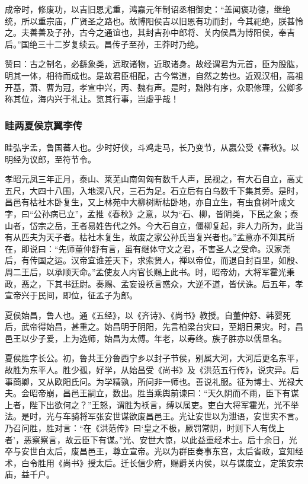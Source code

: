 \documentclass[]{article}
\begin{document}
成帝时，修废功，以吉旧恩尤重，鸿嘉元年制诏丞相御史：``盖闻褒功德，继绝统，所以重宗庙，广贤圣之路也。故博阳侯吉以旧恩有功而封，今其祀绝，朕甚怜之。夫善善及子孙，古今之通谊也，其封吉孙中郎将、关内侯昌为博阳侯，奉吉后。''国绝三十二岁复续云。昌传子至孙，王莽时乃绝。

赞曰：古之制名，必繇象类，远取诸物，近取诸身。故经谓君为元首，臣为股肱，明其一体，相待而成也。是故君臣相配，古今常道，自然之势也。近观汉相，高祖开基，萧、曹为冠，孝宣中兴，丙、魏有声。是时，黜陟有序，众职修理，公卿多称其位，海内兴于礼让。览其行事，岂虚乎哉！

\hypertarget{header-n5357}{%
\subsubsection{眭两夏侯京翼李传}\label{header-n5357}}

眭弘字孟，鲁国蕃人也。少时好侠，斗鸡走马，长乃变节，从嬴公受《春秋》。以明经为议郎，至符节令。

孝昭元凤三年正月，泰山、莱芜山南匈匈有数千人声，民视之，有大石自立，高丈五尺，大四十八围，入地深八尺，三石为足。石立后有白乌数千下集其旁。是时，昌邑有枯社木卧复生，又上林苑中大柳树断枯卧地，亦自立生，有虫食树叶成文字，曰``公孙病已立''，孟推《春秋》之意，以为``石、柳，皆阴类，下民之象；泰山者，岱宗之岳，王者易姓告代之外。今大石自立，僵柳复起，非人力所为，此当有从匹夫为天子者。枯社木复生，故废之家公孙氏当复兴者也。''孟意亦不知其所在，即说曰：``先师董仲舒有言，虽有继体守文之君，不害圣人之受命。汉家尧后，有传国之运。汉帝宜谁差天下，求索贤人，禅以帝位，而退自封百里，如殷、周二王后，以承顺天命。''孟使友人内官长赐上此书。时，昭帝幼，大将军霍光秉政，恶之，下其书廷尉。奏赐、孟妄设袄言惑众，大逆不道，皆伏诛。后五年，孝宣帝兴于民间，即位，征孟子为郎。

夏侯始昌，鲁人也。通《五经》，以《齐诗》、《尚书》教授。自董仲舒、韩婴死后，武帝得始昌，甚重之。始昌明于阴阳，先言柏梁台灾曰，至期日果灾。时，昌邑王以少子爱，上为选师，始昌为太傅。年老，以寿终。族子胜亦以儒显名。

夏侯胜字长公。初，鲁共王分鲁西宁乡以封子节侯，别属大河，大河后更名东平，故胜为东平人。胜少孤，好学，从始昌受《尚书》及《洪范五行传》，说灾异。后事蕳卿，又从欧阳氏问。为学精孰，所问非一师也。善说礼服。征为博士、光禄大夫。会昭帝崩，昌邑王嗣立，数出。胜当乘舆前谏曰：``天久阴而不雨，臣下有谋上者，陛下出欲何之？''王怒，谓胜为袄言，缚以属吏。吏白大将军霍光，光不举法。是时，光与车骑将军张安世谋欲废昌邑王。光让安世以为泄语，安世实不言。乃召问胜，胜对言：``在《洪范传》曰`皇之不极，厥罚常阴，时则下人有伐上者'，恶察察言，故云臣下有谋。''光、安世大惊，以此益重经术士。后十余日，光卒与安世白太后，废昌邑王，尊立宣帝。光以为群臣奏事东宫，太后省政，宜知经术，白令胜用《尚书》授太后。迁长信少府，赐爵关内侯，以与谋废立，定策安宗庙，益千户。
\end{document}
